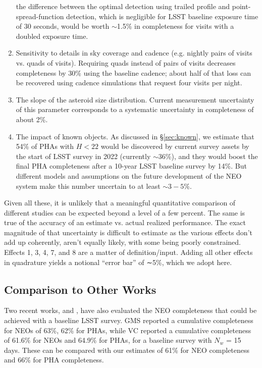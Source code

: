 \begin{enumerate}
          the difference between the optimal detection using trailed profile and point-spread-function
          detection, which is negligible for LSST baseline exposure time of 30 seconds, would be worth $\sim$1.5\%
          in completeness for visits with a doubled exposure time.
\item Sensitivity to details in sky coverage and cadence (e.g. nightly pairs of visits vs. quads of visits).
          Requiring quads instead of pairs of visits decreases completeness by 30\% using the baseline cadence;
          about half of that loss can be recovered using cadence simulations that request four visits per night.
\item The slope of the asteroid size distribution. Current measurement uncertainty of this parameter
          corresponds to a systematic uncertainty in completeness of about 2\%.
\item The impact of known objects. As discussed in \S\ref{sec:known}, we estimate that 54\% of PHAs with $H<22$ would be discovered
          by current survey assets by the start of LSST survey in 2022 (currently $\sim$36\%), and they would
          boost the final PHA completeness after a 10-year LSST baseline survey by 14\%. But different models and assumptions on the future development of the NEO system make this number uncertain to at least $\sim 3-5$\%.
\end{enumerate}

Given all these, it is unlikely that a meaningful quantitative comparison of different studies can be expected beyond a level of a few percent. The same is true of the accuracy of an estimate vs. actual realized performance. The exact magnitude of that uncertainty is difficult to estimate as the various effects don't add up coherently, aren't equally likely, with some being poorly constrained. Effects 1, 3, 4, 7,  and 8 are a matter of definition/input. Adding all other effects in quadrature yields a notional ``error bar'' of ∼5\%, which we adopt here.

\subsection{Comparison to Other Works  \label{sec:other}}

Two recent works, \citet*[][hereafter GMS]{GMS2016} and \citet*[][hereafter VC]{VeresChesley2017neo}, 
have also evaluated the NEO completeness that could be achieved with a baseline LSST survey.
GMS reported a cumulative completeness for NEOs of 63\%, 62\% for PHAs,
while VC reported a cumulative completeness of 61.6\%  for NEOs and 64.9\% for PHAs, 
for a baseline survey with $N_w$ = 15 days. These can be compared with our estimates of 61\% for NEO completeness
and 66\% for PHA completeness.

